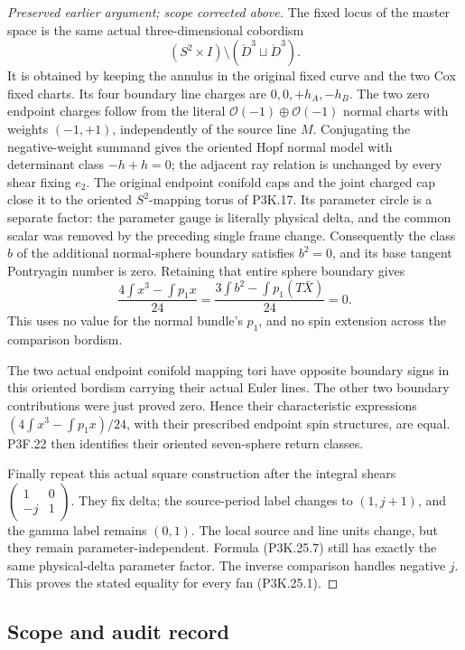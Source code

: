 \begin{proof}[Preserved earlier argument; scope corrected above]
The fixed locus of the master space is the same actual
three-dimensional cobordism
\[
 (S^2\times I)\setminus
                   (\mathring D^3\sqcup\mathring D^3).
\]
It is obtained by keeping the annulus in the original fixed
curve and the two Cox fixed charts. Its four boundary
line charges are \(0,0,+h_A,-h_B\).
The two zero endpoint charges follow from the literal
\(\mathcal O(-1)\oplus\mathcal O(-1)\) normal charts with
weights \((-1,+1)\), independently of the source line \(M\).
Conjugating the negative-weight summand gives the oriented
Hopf normal model with determinant class
\(-h+h=0\); the adjacent ray relation is unchanged by
every shear fixing \(e_2\).
The original endpoint conifold caps and the joint charged
cap close it to the oriented \(S^2\)-mapping torus of P3K.17.
Its parameter circle is a separate factor: the parameter
gauge is literally physical delta, and the common scalar was
removed by the preceding single frame change. Consequently
the class \(b\) of the additional normal-sphere boundary
satisfies \(b^2=0\), and its base tangent Pontryagin number
is zero. Retaining that entire sphere boundary gives
\[
 \frac{4\int x^3-\int p_1x}{24}
       =\frac{3\int b^2-\int p_1(T\bar X)}{24}=0.
                                                        \tag{P3K.25.10}
\]
This uses no value for the normal bundle's \(p_1\), and no
spin extension across the comparison bordism.

The two actual endpoint conifold mapping tori have opposite
boundary signs in this oriented bordism carrying their
actual Euler lines. The other two boundary contributions
were just proved zero. Hence their characteristic expressions
\((4\int x^3-\int p_1x)/24\), with their prescribed endpoint
spin structures, are equal. P3F.22 then identifies their
oriented seven-sphere return classes.

Finally repeat this actual square construction after the
integral shears
\(\left(\begin{smallmatrix}1&0\\-j&1\end{smallmatrix}\right)\).
They fix delta; the source-period label changes to
\((1,j+1)\), and the gamma label remains \((0,1)\).
The local source and line units change, but they remain
parameter-independent. Formula (P3K.25.7) still has exactly
the same physical-delta parameter factor. The inverse
comparison handles negative \(j\). This proves the stated
equality for every fan (P3K.25.1).
\end{proof}
\subsection{Scope and audit record}

